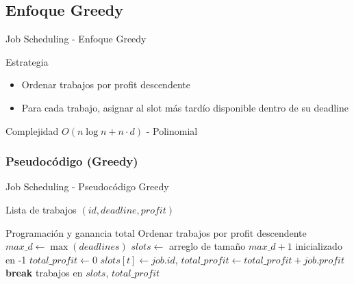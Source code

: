 \documentclass[aspectratio=169]{beamer}
\renewcommand{\algorithmicrequire}{\textbf{Entrada:}}
\renewcommand{\algorithmicensure}{\textbf{Salida:}}
\newcommand{\REQUIRE}{\item[\algorithmicrequire]}
\newcommand{\ENSURE}{\item[\algorithmicensure]}
\begin{document}
\subsection{Enfoque Greedy}
\begin{frame}{Job Scheduling - Enfoque Greedy}
\begin{block}{Estrategia}
\begin{itemize}
\item Ordenar trabajos por profit descendente
\item Para cada trabajo, asignar al slot más tardío disponible dentro de su deadline
\end{itemize}
\end{block}

\begin{alertblock}{Complejidad}
$O(n \log n + n \cdot d)$ - Polinomial
\end{alertblock}
\end{frame}

\subsubsection{Pseudocódigo (Greedy)}
\begin{frame}[fragile]{Job Scheduling - Pseudocódigo Greedy}
\begin{algorithmic}[1]
\REQUIRE Lista de trabajos $(id, deadline, profit)$
\ENSURE Programación y ganancia total
\State Ordenar trabajos por profit descendente
\State $max\_d \leftarrow \max(deadlines)$
\State $slots \leftarrow$ arreglo de tamaño $max\_d+1$ inicializado en -1
\State $total\_profit \leftarrow 0$
            \State $slots[t] \leftarrow job.id$, $total\_profit \leftarrow total\_profit + job.profit$
            \State \textbf{break}
        \EndIf
    \EndFor
\EndFor
\Return trabajos en $slots$, $total\_profit$
\end{algorithmic}
\end{frame}
\end{document}
